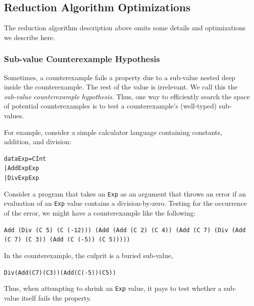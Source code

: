 \documentclass[10pt]{sigplanconf}
\newenvironment{code}{\begin{alltt}}{\end{alltt}}
\newcommand{\ttp}[1]{\texttt{#1}}
\begin{document}
\subsection{Reduction Algorithm Optimizations}
The reduction algorithm description above omits some details and optimizations
we describe here.

\subsubsection{Sub-value Counterexample Hypothesis}\label{sec:subval}
Sometimes, a counterexample fails a property due to a sub-value nested deep
inside the counterexample.  The rest of the value is irrelevant.  We call this
the \emph{sub-value counterexample hypothesis.}  Thus, one way to efficiently
search the space of potential counterexamples is to test a counterexample's
(well-typed) sub-values.

For example, consider a simple calculator language containing constants,
addition, and division:
%
\begin{code}
data Exp = C Int
         | Add Exp Exp
         | Div Exp Exp
\end{code}
%
\noindent
Consider a program that takes an \ttp{Exp} as an argument that throws an error
if an evaluation of an \ttp{Exp} value contains a division-by-zero.  Testing for
the occurrence of the error, we might have a counterexample like the following:
%
\medskip%
\begin{sloppypar}
\noindent%
\ttp{Add (Div (C 5) (C (-12))) (Add (Add (C 2) (C 4)) (Add (C 7) (Div (Add (C 7)
  (C 3)) (Add (C (-5)) (C 5)))))}
\end{sloppypar}
\medskip%
In the counterexample, the culprit is a buried sub-value,
%
\begin{code}
Div (Add (C 7) (C 3)) (Add (C (-5)) (C 5))
\end{code}
%
Thus, when attempting to shrink an \ttp{Exp} value, it pays to test whether a
sub-value itself fails the property.
\end{document}
